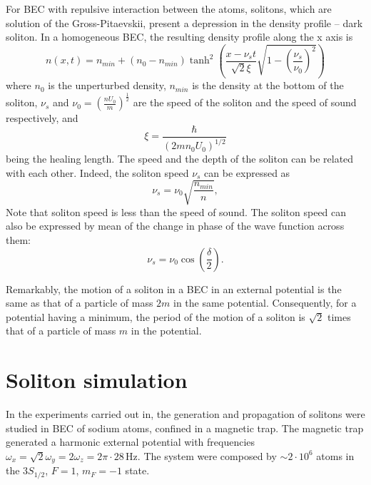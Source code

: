 For BEC with repulsive interaction between the atoms, solitons, which are solution of the Gross-Pitaevskii, present a depression in the density profile -- dark soliton. In a homogeneous BEC, the resulting density profile along the x axis is
\begin{equation}
n(x,t) = n_{min} + \left(n_0 - n_{min}\right)\tanh^2 \left( \frac{x - \nu_s t}{\sqrt{2} \xi} \sqrt{1 - \left( \frac{\nu_s}{\nu_0} \right)^2 } \right)
\end{equation}
where $n_0$ is the unperturbed density, $n_{min}$ is the density at the bottom of the soliton, $\nu_s$ and  $\nu_0 = (\frac{nU_0}{m})^{\frac{1}{2}}$ are the speed of the soliton and the speed of sound respectively, and 
\begin{equation}
\xi = \frac{\hbar}{\left( 2mn_0 U_0 \right)^{1/2}}
\end{equation}
being the healing length.
The speed and the depth of the soliton can be related with each other. Indeed, the soliton speed $\nu_s$ can be expressed as
\begin{equation} \label{eq:soliton-speed-density}
\nu_s = \nu_0 \sqrt{ \frac{n_{min}}{n} },
\end{equation}
 Note that soliton speed is less than the speed of sound.
The soliton speed can also be expressed by mean of the change in phase of the wave function across them:
\begin{equation}
\nu_s = \nu_0 \cos \left( \frac{\delta}{2} \right).
\end{equation}

Remarkably, the motion of a soliton in a BEC in an external potential is the same as that of a particle of mass $2m$ in the same potential.
Consequently, for a potential having a minimum, the period of the motion of a soliton is $\sqrt{2}$ times that of a particle of mass $m$ in the potential.

\section{Soliton simulation}
In the experiments carried out in, %
the generation and propagation of solitons were studied in BEC of sodium atoms, confined in a magnetic trap. The magnetic trap generated a harmonic external potential with frequencies $\omega_x = \sqrt{2}\omega_y = 2 \omega_z = 2 \pi \cdot 28\,$Hz. The system were composed by  $\sim 2 \cdot 10^6$ atoms in the $3S_{1/2}$, $F=1$, $m_F=-1$ state. 

